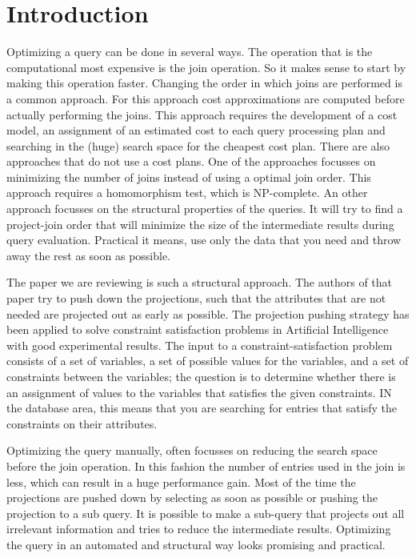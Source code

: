 \section{Introduction} \label{sec:Introduction}
Optimizing a query can be done in several ways. The operation that is the computational most expensive is the join operation. So it makes sense to start by making this operation faster. Changing the order in which joins are performed is a common approach. For this approach cost approximations are computed before actually performing the joins. This approach requires  the development of a cost model, an assignment of an estimated cost to each query processing plan and searching in the (huge) search space for the cheapest cost plan. There are also approaches that do not use a cost plans. One of the approaches focusses on minimizing the number of joins instead of using a optimal join order. This approach requires a homomorphism test, which is NP-complete. An other approach focusses on the structural properties of the queries. It will try to find a project-join order that will minimize the size of the intermediate results during query evaluation. Practical it means, use only the data that you need and throw away the rest as soon as possible. 

The paper we are reviewing is such a structural approach. The authors of that paper try to push down the projections, such that the attributes that are not needed are projected out as early as possible. The projection pushing strategy has been applied to solve constraint satisfaction problems in Artificial Intelligence with good experimental results. The input to a constraint-satisfaction problem consists of a set of variables, a set of possible values for the variables, and a set of constraints between the variables; the question is to determine whether there is an assignment of values to the variables that satisfies the given constraints. IN the database area, this means that you are searching for entries that satisfy the constraints on their attributes. 

Optimizing the query manually, often focusses on reducing the search space before the join operation. In this fashion the number of entries used in the join is less, which can result in a huge performance gain. Most of the time the projections are pushed down by selecting as soon as possible or pushing the projection to a sub query. It is possible to make a sub-query that projects out all irrelevant information and tries to reduce the intermediate results. Optimizing the query in an automated and structural way looks promising and practical. 